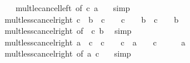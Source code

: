 \begin{isabellebody}
%
\isadelimproof
\ \ %
\endisadelimproof
%
\isatagproof
{}\isamarkupfalse%
\ mult{\isacharunderscore}{\kern0pt}le{\isacharunderscore}{\kern0pt}cancel{\isacharunderscore}{\kern0pt}left\ {\isacharbrackleft}{\kern0pt}of\ c\ a\ {}{\isacharbrackright}{\kern0pt}\ \isamarkupfalse%
\ simp%
\endisatagproof
{\isafoldproof}%
%
\isadelimproof
\isanewline
%
\endisadelimproof
\isanewline
{}\isamarkupfalse%
\ mult{\isacharunderscore}{\kern0pt}less{\isacharunderscore}{\kern0pt}cancel{\isacharunderscore}{\kern0pt}right{}{\isacharcolon}{\kern0pt}\ {\isachardoublequoteopen}c\ {\isacharless}{\kern0pt}\ b\ {\isacharasterisk}{\kern0pt}\ c\ {\isasymlongleftrightarrow}\ {\isacharparenleft}{\kern0pt}{}\ {\isasymle}\ c\ {\isasymlongrightarrow}\ {}\ {\isacharless}{\kern0pt}\ b{\isacharparenright}{\kern0pt}\ {\isasymand}\ {\isacharparenleft}{\kern0pt}c\ {\isasymle}\ {}\ {\isasymlongrightarrow}\ b\ {\isacharless}{\kern0pt}\ {}{\isacharparenright}{\kern0pt}{\isachardoublequoteclose}\isanewline
%
\isadelimproof
\ \ %
\endisadelimproof
%
\isatagproof
{}\isamarkupfalse%
\ mult{\isacharunderscore}{\kern0pt}less{\isacharunderscore}{\kern0pt}cancel{\isacharunderscore}{\kern0pt}right\ {\isacharbrackleft}{\kern0pt}of\ {}\ c\ b{\isacharbrackright}{\kern0pt}\ \isamarkupfalse%
\ simp%
\endisatagproof
{\isafoldproof}%
%
\isadelimproof
\isanewline
%
\endisadelimproof
\isanewline
{}\isamarkupfalse%
\ mult{\isacharunderscore}{\kern0pt}less{\isacharunderscore}{\kern0pt}cancel{\isacharunderscore}{\kern0pt}right{}{\isacharcolon}{\kern0pt}\ {\isachardoublequoteopen}a\ {\isacharasterisk}{\kern0pt}\ c\ {\isacharless}{\kern0pt}\ c\ {\isasymlongleftrightarrow}\ {\isacharparenleft}{\kern0pt}{}\ {\isasymle}\ c\ {\isasymlongrightarrow}\ a\ {\isacharless}{\kern0pt}\ {}{\isacharparenright}{\kern0pt}\ {\isasymand}\ {\isacharparenleft}{\kern0pt}c\ {\isasymle}\ {}\ {\isasymlongrightarrow}\ {}\ {\isacharless}{\kern0pt}\ a{\isacharparenright}{\kern0pt}{\isachardoublequoteclose}\isanewline
%
\isadelimproof
\ \ %
\endisadelimproof
%
\isatagproof
{}\isamarkupfalse%
\ mult{\isacharunderscore}{\kern0pt}less{\isacharunderscore}{\kern0pt}cancel{\isacharunderscore}{\kern0pt}right\ {\isacharbrackleft}{\kern0pt}of\ a\ c\ {}{\isacharbrackright}{\kern0pt}\ \isamarkupfalse%
\ simp%
\endisatagproof
{\isafoldproof}%
%
\isadelimproof
\isanewline
%
\endisadelimproof

\end{isabellebody}
